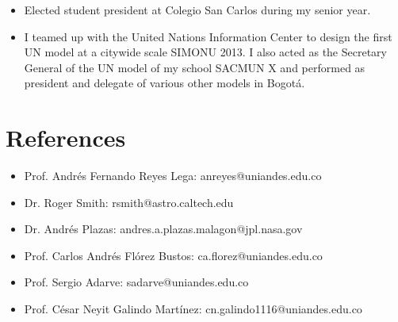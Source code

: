 \documentclass[line,margin]{res}
\begin{document}
\begin{resume}
\begin{itemize}
\item Elected student president at Colegio San Carlos during my senior year.

\item I teamed up with the United Nations Information Center to design the first UN model at a citywide scale SIMONU 2013. I also acted as the Secretary General of the UN model of my school SACMUN X and performed as president and delegate of various other models in Bogotá.

\end{itemize}  
  
\section{References}  

\begin{itemize}

\item Prof. Andrés Fernando Reyes Lega: anreyes@uniandes.edu.co

\item Dr. Roger Smith: rsmith@astro.caltech.edu 

\item Dr. Andrés Plazas: andres.a.plazas.malagon@jpl.nasa.gov

\item Prof. Carlos Andrés Flórez Bustos: ca.florez@uniandes.edu.co

\item Prof. Sergio Adarve: sadarve@uniandes.edu.co

\item Prof. César Neyit Galindo Martínez: cn.galindo1116@uniandes.edu.co

\end{itemize}
  
\end{resume}
\end{document}
